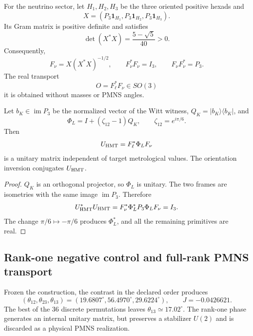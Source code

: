 For the neutrino sector, let \(H_1,H_2,H_3\) be the three oriented positive hexads
and
\[
 X=(P_3\mathbf1_{H_1},P_3\mathbf1_{H_2},P_3\mathbf1_{H_3}).
\]
Its Gram matrix is positive definite and satisfies
\[
 \det(X^*X)=\frac{5-\sqrt5}{40}>0.
\]
Consequently,
\[
 F_\nu=X(X^*X)^{-1/2},
 \qquad F_\nu^*F_\nu=I_3,
 \qquad F_\nu F_\nu^*=P_3.
\]
The real transport
\begin{equation}
 O=F_\ell^*F_\nu\in SO(3)
 \label{eq:transporte-frames-pmns-rev11}
\end{equation}
it is obtained without masses or PMNS angles.

\begin{theorem}
\label{thm:unitaria-interna-pmns-rev11}
Let \(b_K\in\operatorname{im}P_3\) be the normalized vector of the Witt witness,
\(Q_K=|b_K\rangle\langle b_K|\), and
\[
 \Phi_L=I+(\zeta_{12}-1)Q_K,
 \qquad \zeta_{12}=e^{i\pi/6}.
\]
Then
\begin{equation}
 U_{\rm HMT}=F_\ell^*\Phi_LF_\nu
 \label{eq:unitaria-interna-pmns-rev11}
\end{equation}
is a unitary matrix independent of target metrological values. The
orientation inversion conjugates
\(U_{\rm HMT}\).
\end{theorem}

\begin{proof}
\(Q_K\) is an orthogonal projector, so \(\Phi_L\) is unitary. The two
frames are isometries with the same image \(\operatorname{im}P_3\). Therefore
\[
 U_{\rm HMT}^*U_{\rm HMT}
 =F_\nu^*\Phi_L^*P_3\Phi_LF_\nu=I_3.
\]
The change \(\pi/6\mapsto-\pi/6\) produces \(\Phi_L^*\), and all the
remaining primitives are real.
\end{proof}

\subsection{Rank-one negative control and full-rank PMNS transport}
\label{sec:no-go-pmns-rango-uno-rev11}

Frozen the construction, the contrast in the declared order produces
\[
 (\theta_{12},\theta_{23},\theta_{13})
 =(19.6807^\circ,56.4970^\circ,29.6224^\circ),
 \qquad J=-0.0426621.
\]
The best of the 36 discrete permutations leaves
\(\theta_{13}\simeq17.02^\circ\). The rank-one phase generates an internal
unitary matrix, but preserves a stabilizer \(U(2)\) and is discarded
as a physical PMNS realization.

